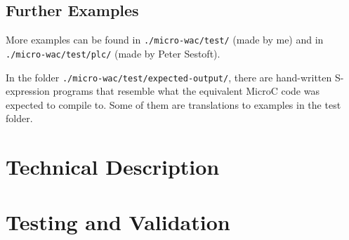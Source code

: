 \documentclass[a4paper]{article}
\begin{document}
\subsection{Further Examples}
More examples can be found in \texttt{./micro-wac/test/} (made by me) and in \texttt{./micro-wac/test/plc/} (made by Peter Sestoft).

In the folder \texttt{./micro-wac/test/expected-output/}, there are hand-written S-expression programs that resemble what the equivalent MicroC code was expected to compile to. Some of them are translations to examples in the test folder.

\section{Technical Description}
\label{sec:technical}

\section{Testing and Validation}
\label{sec:testing}
\end{document}
